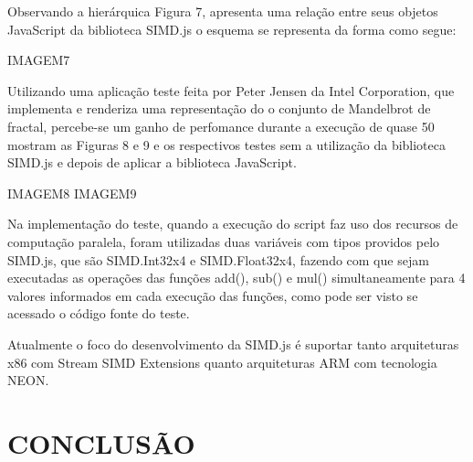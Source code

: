 \documentclass{article}
\begin{document}
Observando a hierárquica Figura 7, apresenta uma relação entre seus objetos JavaScript da
biblioteca SIMD.js o esquema se representa da forma como segue:

IMAGEM7

Utilizando uma aplicação teste feita por Peter Jensen da Intel Corporation, que implementa e
renderiza uma representação do o conjunto de Mandelbrot de fractal, percebe-se um ganho
de perfomance durante a execução de quase 50%
mostram as Figuras 8 e 9 e os respectivos testes sem a utilização da biblioteca SIMD.js e
depois de aplicar a biblioteca JavaScript.

IMAGEM8
IMAGEM9

Na implementação do teste, quando a execução do script faz uso dos recursos de
computação paralela, foram utilizadas duas variáveis com tipos providos pelo SIMD.js, que
são SIMD.Int32x4 e SIMD.Float32x4, fazendo com que sejam executadas as operações das
funções add(), sub() e mul() simultaneamente para 4 valores informados em cada execução
das funções, como pode ser visto se acessado o código fonte do teste.

Atualmente o foco do desenvolvimento da SIMD.js é suportar tanto arquiteturas x86 com
Stream SIMD Extensions quanto arquiteturas ARM com tecnologia NEON.

\section{CONCLUSÃO}
\end{document}
